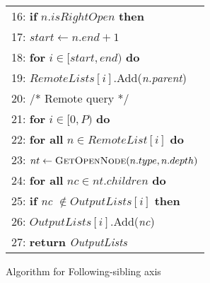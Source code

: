 \begin{figure}[t]
\begin{tabular}{l}
		16: \hspace{4 mm} \textbf{if} $n.isRightOpen$ \textbf{then}\\
		17: \hspace{8 mm} $start \leftarrow n.end + 1$\\
		18: \hspace{4 mm} \textbf{for} $i \in [start, end)$ \textbf{do}\\
		19: \hspace{8 mm} $RemoteLists[i]$.Add(\emph{n.parent})\\
		20: \hspace{0 mm} /* Remote query */\\
		21: \hspace{0 mm} \textbf{for} $i \in [0, P)$ \textbf{do} \\
		22: \hspace{4 mm} \textbf{for all} $n \in RemoteList[i]$ \textbf{do} \\
		23: \hspace{8 mm} $nt \leftarrow \textsc{GetOpenNode}(n.type, n.depth)$ \\
		24: \hspace{8 mm} \textbf{for all} $nc \in nt.children$ \textbf{do}\\
		25: \hspace{12 mm} \textbf{if} \emph{nc} $\not \in OutputLists[i]$ \textbf{then} \\
		26: \hspace{16 mm} $OutputLists[i]$.Add(\emph{nc})\\
		27: \hspace{4 mm} \textbf{return} \emph{OutputLists}   	 \\	
		\hline
	\end{tabular}
	\caption{Algorithm for Following-sibling axis}
\end{figure}

